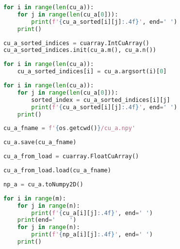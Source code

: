 \documentclass{article}
\begin{document}
    \begin{lstlisting}[language=Python]
for i in range(len(cu_a)):
    for j in range(len(cu_a[0])):
        print(f'{cu_a_sorted[i][j]:.4f}', end=' ')
    print()
    \end{lstlisting}


    \begin{lstlisting}[language=Python]
cu_a_sorted_indices = cuarray.IntCuArray()
cu_a_sorted_indices.init(cu_a.m(), cu_a.n())
    \end{lstlisting}

    \begin{lstlisting}[language=Python]
for i in range(len(cu_a)):
    cu_a_sorted_indices[i] = cu_a.argsort(i)[0]
    \end{lstlisting}

    \begin{lstlisting}[language=Python]
for i in range(len(cu_a)):
    for j in range(len(cu_a[0])):
        sorted_index = cu_a_sorted_indices[i][j]
        print(f'{cu_a_sorted[i][j]:.4f}', end=' ')
    print()
    \end{lstlisting}

    \begin{lstlisting}[language=Python]
cu_a_fname = f'{os.getcwd()}/cu_a.npy'
    \end{lstlisting}

    \begin{lstlisting}[language=Python]
cu_a.save(cu_a_fname)
    \end{lstlisting}

    \begin{lstlisting}[language=Python]
cu_a_from_load = cuarray.FloatCuArray()
    \end{lstlisting}

    \begin{lstlisting}[language=Python]
cu_a_from_load.load(cu_a_fname)
    \end{lstlisting}

    \begin{lstlisting}[language=Python]
np_a = cu_a.toNumpy2D()
    \end{lstlisting}

    \begin{lstlisting}[language=Python]
for i in range(m):
    for j in range(n):
        print(f'{cu_a[i][j]:.4f}', end=' ')
    print(end='    ')
    for j in range(n):
        print(f'{np_a[i][j]:.4f}', end=' ')
    print()
    \end{lstlisting}
\end{document}

